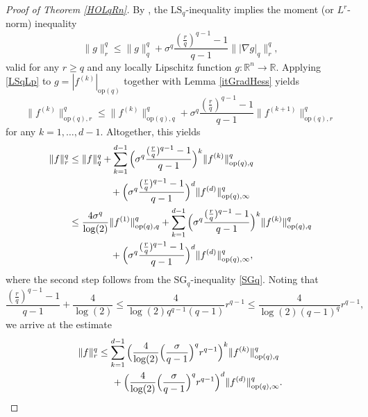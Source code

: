 \documentclass[a4paper,12pt]{amsart}
\numberwithin{equation}{section}
\theoremstyle{remark}
\def\R{{\mathbb R}}
\begin{document}
\begin{proof}[Proof of Theorem \ref{HOLqRn}]
    By \cite[Th.\ 6.1]{Bob10}, the $\mathrm{LS}_q$-inequality implies the moment (or $L^r$-norm) inequality
    \begin{equation}\label{LSqLp}
    \lVert g \rVert_r^q \le \lVert g \rVert_q^q + \sigma^q \frac{(\frac{r}{q})^{q-1}-1}{q-1} \lVert |\nabla g|_q \rVert_r^q,
    \end{equation}
    valid for any $r \ge q$ and any locally Lipschitz function $g \colon \R^n \to \R$. Applying \eqref{LSqLp} to $g= |f^{(k)}|_{\mathrm{op}(q)}$ together with Lemma \ref{itGradHess} yields
    \[
    \lVert f^{(k)} \rVert_{\mathrm{op}(q),r}^q \le \lVert f^{(k)} \rVert_{\mathrm{op}(q),q}^q + \sigma^q \frac{(\frac{r}{q})^{q-1}-1}{q-1} \lVert f^{(k+1)} \rVert_{\mathrm{op}(q),r}^q
    \]
    for any $k=1, \ldots,d-1$. Altogether, this yields
    \begin{align*}
        \lVert f \rVert_r^q &\le \lVert f \rVert_q^q + \sum_{k=1}^{d-1} \Big(\sigma^q \frac{(\frac{r}{q})^{q-1}-1}{q-1}\Big)^k \lVert f^{(k)} \rVert_{\mathrm{op}(q),q}^q\\
        &\hspace{1.5cm} + \Big(\sigma^q \frac{(\frac{r}{q})^{q-1}-1}{q-1}\Big)^d \lVert f^{(d)} \rVert_{\mathrm{op}(q),\infty}^q\\
        &\le \frac{4\sigma^q}{\log(2)} \lVert f^{(1)} \rVert_{\mathrm{op}(q),q}^q + \sum_{k=1}^{d-1} \Big(\sigma^q \frac{(\frac{r}{q})^{q-1}-1}{q-1}\Big)^k \lVert f^{(k)} \rVert_{\mathrm{op}(q),q}^q\\
        &\hspace{1.5cm} + \Big(\sigma^q \frac{(\frac{r}{q})^{q-1}-1}{q-1}\Big)^d \lVert f^{(d)} \rVert_{\mathrm{op}(q),\infty}^q,
    \end{align*}
    where the second step follows from the $\mathrm{SG}_q$-inequality \eqref{SGq}. Noting that
    \[
    \frac{(\frac{r}{q})^{q-1}-1}{q-1} + \frac{4}{\log(2)} \le \frac{4}{\log(2)q^{q-1}(q-1)}r^{q-1} \le \frac{4}{\log(2)(q-1)^q}r^{q-1},
    \]
    we arrive at the estimate
    \begin{align}\label{iteratedBd}
    \begin{split}
        \lVert f \rVert_r^q &\le \sum_{k=1}^{d-1} \Big(\frac{4}{\log(2)} \Big(\frac{\sigma}{q-1}\Big)^q r^{q-1}\Big)^k \lVert f^{(k)} \rVert_{\mathrm{op}(q),q}^q\\
        &\hspace{0.5cm} + \Big(\frac{4}{\log(2)} \Big(\frac{\sigma}{q-1}\Big)^q r^{q-1}\Big)^d \lVert f^{(d)} \rVert_{\mathrm{op}(q),\infty}^q.
        \end{split}
    \end{align}


\end{proof}
\end{document}
